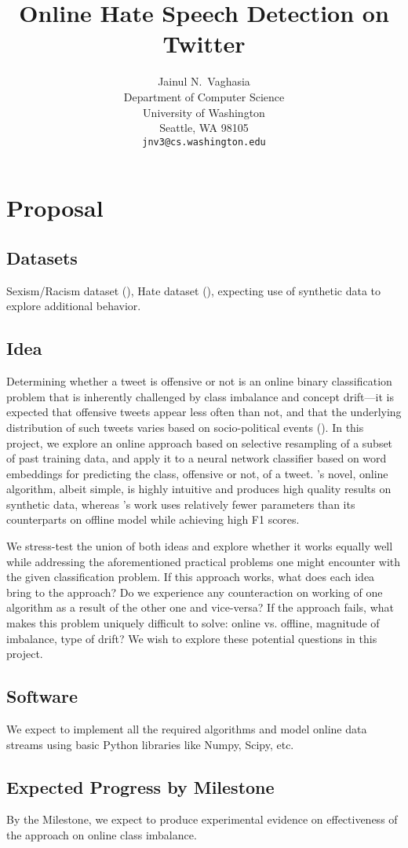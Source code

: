 \documentclass{article}
\title{Online Hate Speech Detection on Twitter}
\author{
    Jainul N.~Vaghasia\\
    Department of Computer Science\\
    University of Washington\\
    Seattle, WA 98105 \\
    \texttt{jnv3@cs.washington.edu}
  }
\begin{document}
  
  \maketitle
  \section{Proposal}
  \subsection{Datasets}
  Sexism/Racism dataset (\cite{waseem-hovy:2016:N16-2}), Hate dataset (\cite{hateoffensive}), expecting use of synthetic data to explore additional behavior.
  \subsection{Idea}
  Determining whether a tweet is offensive or not is an online binary classification problem that is
  inherently challenged by class imbalance and concept drift---it is expected that offensive tweets appear
  less often than not, and that the underlying distribution of such tweets varies based on socio-political events (\cite{Golbeck:2017:LLC:3091478.3091509}).
  In this project, we explore an online approach based on selective resampling of a subset of past training data,
  and apply it to a neural network classifier based on word embeddings for predicting the class, offensive or not, of a tweet.
  \cite{Malialis2018QueueBasedRF}'s novel, online algorithm, albeit simple, is highly intuitive and produces high quality results on synthetic data, whereas
  \cite{kshirsagar2018predictive}'s work uses relatively fewer parameters than its counterparts on offline model while achieving high F1 scores.
  
  We stress-test the union of both ideas
  and explore whether it works equally well while addressing the aforementioned practical problems one might encounter with the given classification problem.
  If this approach works, what does each idea bring to the approach?
  Do we experience any counteraction on working of one algorithm as a result of the other one and vice-versa?
  If the approach fails, what makes this problem uniquely difficult to solve: online vs. offline, magnitude of imbalance, type of drift? We wish
  to explore these potential questions in this project.
  \subsection{Software}
  We expect to implement all the required algorithms and model online data streams using basic Python libraries like Numpy, Scipy, etc.

  \subsection{Expected Progress by Milestone}
  By the Milestone, we expect to produce experimental evidence on effectiveness of the approach on online class imbalance.

  
  

  
\end{document}
